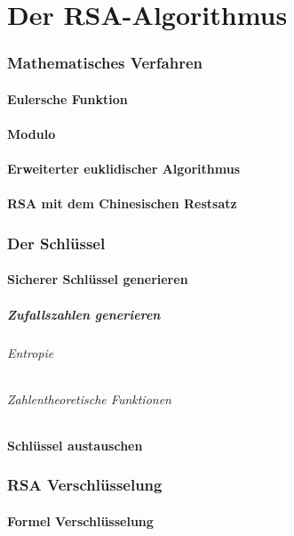 \part{Der RSA-Algorithmus}
\section{Mathematisches Verfahren}
\subsection{Eulersche Funktion}
\subsection{Modulo}
\subsection{Erweiterter euklidischer Algorithmus}
\subsection{RSA mit dem Chinesischen Restsatz}
\section{Der Schlüssel}
\subsection{Sicherer Schlüssel generieren}
\subsubsection{Zufallszahlen generieren}
\paragraph{Entropie}
\paragraph{Zahlentheoretische Funktionen}
\subsection{Schlüssel austauschen}
\section{RSA Verschlüsselung}
\subsection{Formel Verschlüsselung}
